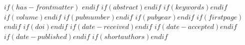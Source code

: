 $if(has-frontmatter)$
\frontmatter
$endif$
$if(abstract)$$endif$
$if(keywords)$$endif$
$if(volume)$$endif$
$if(pubnumber)$$endif$
$if(pubyear)$$endif$
$if(firstpage)$$endif$
$if(doi)$$endif$
$if(date-received)$$endif$
$if(date-accepted)$$endif$
$if(date-published)$$endif$
$if(shortauthors)$$endif$
\maketitle

